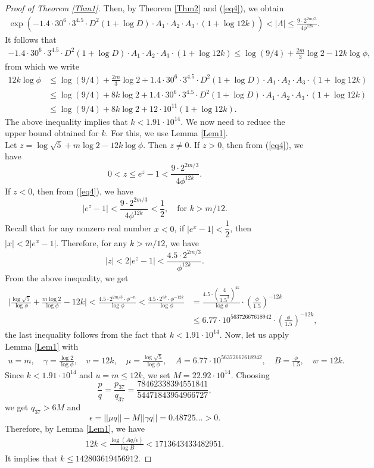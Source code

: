 \documentclass[12pt,reqno]{amsart}
\begin{document}
\begin{proof}[Proof of Theorem \ref{Thm1}]
Then, by Theorem \ref{Thm2} and (\ref{eq4}), we obtain 
\begin{align*}
    \exp(-1.4\cdot 30^{6}\cdot 3^{4.5}\cdot D^2(1+\log D)\cdot A_1\cdot A_2\cdot A_3\cdot (1+\log 12k))<|\Lambda|\leq\frac{9\cdot 2^{2m/3}}{4\phi^{12k}}.
\end{align*}
It follows that
\begin{align*}
-1.4\cdot 30^{6}\cdot 3^{4.5}\cdot D^2(1+\log D)\cdot A_1\cdot A_2\cdot A_3\cdot(1+\log 12k)\leq \log(9/4)+\frac{2m}{3}\log2-12k\log \phi,
\end{align*}
from which we write
\begin{align*}
12k\log \phi&\leq \log(9/4)+\frac{2m}{3}\log2+1.4\cdot 30^{6}\cdot 3^{4.5}\cdot D^2(1+\log D)\cdot A_1\cdot A_2\cdot A_3\cdot(1+\log 12k)\\
&\leq\log(9/4)+8k\log2+1.4\cdot 30^{6}\cdot 3^{4.5}\cdot D^2(1+\log D)\cdot A_1\cdot A_2\cdot A_3\cdot(1+\log12k)\\
&\leq \log(9/4)+8k\log2+12\cdot10^{11}(1+\log 12k).
\end{align*}
The above inequality implies that $k<1.91\cdot 10^{14}$. We now need to reduce the upper bound obtained for $k$. For this, we use Lemma \ref{Lem1}.\\
Let $z=\log\sqrt{5}+m\log 2-12k\log \phi$. Then $z\neq 0$. If $z>0$, then from (\ref{eq4}), we have
$$0<z\leq e^{z}-1<\frac{9\cdot 2^{2m/3}}{4\phi^{12k}}.$$
If $z<0$, then from (\ref{eq4}), we have
$$|e^{z}-1|<\frac{9\cdot 2^{2m/3}}{4\phi^{12k}}<\frac{1}{2}, \quad \text{for }k> m/12.$$
Recall that for any nonzero real number $x<0$, if $|e^{x}-1| <\dfrac{1}{2}$, then $
|x| < 2|e^{x}-1|$. Therefore, for any $k> m/12$, we have 
$$|z|<2|e^{z}-1|<\frac{4.5\cdot 2^{2m/3}}{\phi^{12k}}.$$
From the above inequality, we get
\begin{align*}
\bigg|\frac{\log\sqrt{5}}{\log\phi}+\frac{m\log2}{\log\phi}-12k\bigg|<\frac{4.5\cdot 2^{2m/3}\cdot\phi^{-n}}{\log\phi}<\frac{4.5\cdot 2^{8k}\cdot\phi^{-{12k}}}{\log\phi}&=\frac{4.5\cdot (\dfrac{4}{1.5^3})^{4k}}{\log\phi}\cdot (\frac{\phi}{1.5})^{-12k}\label{eq5}\tag{5}\\
&\leq 6.77\cdot 10^{56372667618942}\cdot (\frac{\phi}{1.5})^{-12k}, 
\end{align*}
the last inequality follows from the fact that $k<1.91\cdot 10^{14}$.
Now, let us apply Lemma \ref{Lem1} with
\begin{align*}
    u=m,\quad \gamma=\frac{\log2}{\log \phi},\quad v=12k,\quad \mu=\frac{\log\sqrt{5}}{\log \phi},\quad A=6.77\cdot 10^{56372667618942},\quad B=\frac{\phi}{1.5},\quad w=12k.
\end{align*}
Since $k< 1.91\cdot  10^{14}$ and $u=m\leq 12k$, we set $M=22.92\cdot 10^{14}$. Choosing  
$$\frac{p}{q}=\frac{p_{37}}{q_{37}}=\frac{78462338394551841}{54471843954966727},$$
we get $q_{37}>6M$ and
$$\epsilon=||\mu q||-M||\gamma q||=0.48725\ldots>0.$$
Therefore, by Lemma \ref{Lem1}, we have
\begin{align*}
    12k<\frac{\log(Aq/\epsilon)}{\log B}<1713643433482951.
\end{align*}
It implies that $k\leq 142803619456912$. 



\end{proof}
\end{document}
